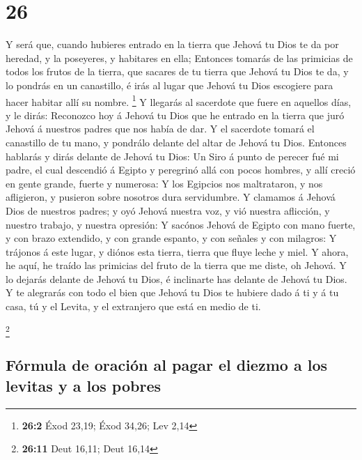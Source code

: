 \hypertarget{section-25}{%
\section{26}\label{section-25}}

 Y será que, cuando hubieres entrado en la tierra que Jehová
tu Dios te da por heredad, y la poseyeres, y habitares en ella;
 Entonces tomarás de las primicias de todos los frutos de la
tierra, que sacares de tu tierra que Jehová tu Dios te da, y lo pondrás
en un canastillo, é irás al lugar que Jehová tu Dios escogiere para
hacer habitar allí su nombre. \footnote{\textbf{26:2} Éxod 23,19; Éxod
  34,26; Lev 2,14}  Y llegarás al sacerdote que fuere en
aquellos días, y le dirás: Reconozco hoy á Jehová tu Dios que he entrado
en la tierra que juró Jehová á nuestros padres que nos había de dar.
 Y el sacerdote tomará el canastillo de tu mano, y pondrálo
delante del altar de Jehová tu Dios.  Entonces hablarás y
dirás delante de Jehová tu Dios: Un Siro á punto de perecer fué mi
padre, el cual descendió á Egipto y peregrinó allá con pocos hombres, y
allí creció en gente grande, fuerte y numerosa:  Y los
Egipcios nos maltrataron, y nos afligieron, y pusieron sobre nosotros
dura servidumbre.  Y clamamos á Jehová Dios de nuestros
padres; y oyó Jehová nuestra voz, y vió nuestra aflicción, y nuestro
trabajo, y nuestra opresión:  Y sacónos Jehová de Egipto con
mano fuerte, y con brazo extendido, y con grande espanto, y con señales
y con milagros:  Y trájonos á este lugar, y diónos esta
tierra, tierra que fluye leche y miel.  Y ahora, he aquí,
he traído las primicias del fruto de la tierra que me diste, oh Jehová.
Y lo dejarás delante de Jehová tu Dios, é inclinarte has delante de
Jehová tu Dios.  Y te alegrarás con todo el bien que Jehová
tu Dios te hubiere dado á ti y á tu casa, tú y el Levita, y el
extranjero que está en medio de ti.

\footnote{\textbf{26:11} Deut 16,11; Deut 16,14}

\hypertarget{fuxf3rmula-de-oraciuxf3n-al-pagar-el-diezmo-a-los-levitas-y-a-los-pobres}{%
\subsection{Fórmula de oración al pagar el diezmo a los levitas y a los
pobres}\label{fuxf3rmula-de-oraciuxf3n-al-pagar-el-diezmo-a-los-levitas-y-a-los-pobres}}

